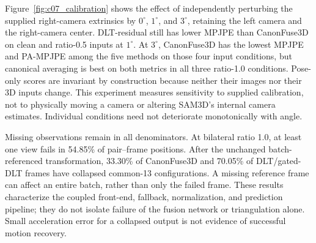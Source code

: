 Figure~\ref{fig:c07_calibration} shows the effect of independently perturbing the supplied right-camera extrinsics by $0^\circ$, $1^\circ$, and $3^\circ$, retaining the left camera and the right-camera center. DLT-residual still has lower MPJPE than CanonFuse3D on clean and ratio-0.5 inputs at $1^\circ$. At $3^\circ$, CanonFuse3D has the lowest MPJPE and PA-MPJPE among the five methods on those four input conditions, but canonical averaging is best on both metrics in all three ratio-1.0 conditions. Pose-only scores are invariant by construction because neither their images nor their 3D inputs change. This experiment measures sensitivity to supplied calibration, not to physically moving a camera or altering SAM3D's internal camera estimates. Individual conditions need not deteriorate monotonically with angle.

Missing observations remain in all denominators. At bilateral ratio 1.0, at least one view fails in 54.85\% of pair--frame positions. After the unchanged batch-referenced transformation, 33.30\% of CanonFuse3D and 70.05\% of DLT/gated-DLT frames have collapsed common-13 configurations. A missing reference frame can affect an entire batch, rather than only the failed frame. These results characterize the coupled front-end, fallback, normalization, and prediction pipeline; they do not isolate failure of the fusion network or triangulation alone. Small acceleration error for a collapsed output is not evidence of successful motion recovery.

\FloatBarrier

